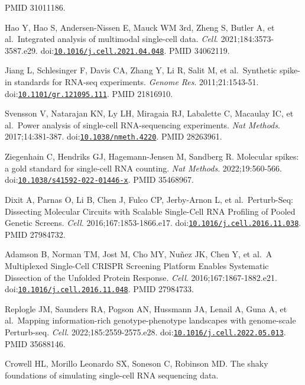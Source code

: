 \documentclass[11pt]{article}
\begin{document}
\begin{enumerate}[label={[\arabic*]},leftmargin=2.6em,labelsep=0.5em,itemsep=1.5pt]
  PMID 31011186.
\item
  Hao Y, Hao S, Andersen-Nissen E, Mauck WM 3rd, Zheng S, Butler A, et
  al.~Integrated analysis of multimodal single-cell data. \emph{Cell}.
  2021;184:3573-3587.e29.
  doi:\href{https://doi.org/10.1016/j.cell.2021.04.048}{\nolinkurl{10.1016/j.cell.2021.04.048}}.
  PMID 34062119.
\item
  Jiang L, Schlesinger F, Davis CA, Zhang Y, Li R, Salit M, et
  al.~Synthetic spike-in standards for RNA-seq experiments. \emph{Genome
  Res}. 2011;21:1543-51.
  doi:\href{https://doi.org/10.1101/gr.121095.111}{\nolinkurl{10.1101/gr.121095.111}}.
  PMID 21816910.
\item
  Svensson V, Natarajan KN, Ly LH, Miragaia RJ, Labalette C, Macaulay
  IC, et al.~Power analysis of single-cell RNA-sequencing experiments.
  \emph{Nat Methods}. 2017;14:381-387.
  doi:\href{https://doi.org/10.1038/nmeth.4220}{\nolinkurl{10.1038/nmeth.4220}}.
  PMID 28263961.
\item
  Ziegenhain C, Hendriks GJ, Hagemann-Jensen M, Sandberg R. Molecular
  spikes: a gold standard for single-cell RNA counting. \emph{Nat
  Methods}. 2022;19:560-566.
  doi:\href{https://doi.org/10.1038/s41592-022-01446-x}{\nolinkurl{10.1038/s41592-022-01446-x}}.
  PMID 35468967.
\item
  Dixit A, Parnas O, Li B, Chen J, Fulco CP, Jerby-Arnon L, et
  al.~Perturb-Seq: Dissecting Molecular Circuits with Scalable
  Single-Cell RNA Profiling of Pooled Genetic Screens. \emph{Cell}.
  2016;167:1853-1866.e17.
  doi:\href{https://doi.org/10.1016/j.cell.2016.11.038}{\nolinkurl{10.1016/j.cell.2016.11.038}}.
  PMID 27984732.
\item
  Adamson B, Norman TM, Jost M, Cho MY, Nuñez JK, Chen Y, et al.~A
  Multiplexed Single-Cell CRISPR Screening Platform Enables Systematic
  Dissection of the Unfolded Protein Response. \emph{Cell}.
  2016;167:1867-1882.e21.
  doi:\href{https://doi.org/10.1016/j.cell.2016.11.048}{\nolinkurl{10.1016/j.cell.2016.11.048}}.
  PMID 27984733.
\item
  Replogle JM, Saunders RA, Pogson AN, Hussmann JA, Lenail A, Guna A, et
  al.~Mapping information-rich genotype-phenotype landscapes with
  genome-scale Perturb-seq. \emph{Cell}. 2022;185:2559-2575.e28.
  doi:\href{https://doi.org/10.1016/j.cell.2022.05.013}{\nolinkurl{10.1016/j.cell.2022.05.013}}.
  PMID 35688146.
\item
  Crowell HL, Morillo Leonardo SX, Soneson C, Robinson MD. The shaky
  foundations of simulating single-cell RNA sequencing data.

\end{enumerate}
\end{document}
